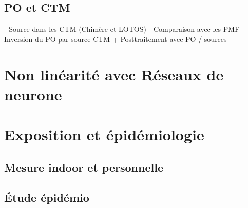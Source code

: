 \subsection{PO et CTM}
- Source dans les CTM (Chimère et LOTOS)
- Comparaison avec les PMF
- Inversion du PO par source CTM + Posttraitement avec PO / sources

\section{Non linéarité avec Réseaux de neurone}

\section{Exposition et épidémiologie}
\subsection{Mesure indoor et personnelle}
\subsection{Étude épidémio}

